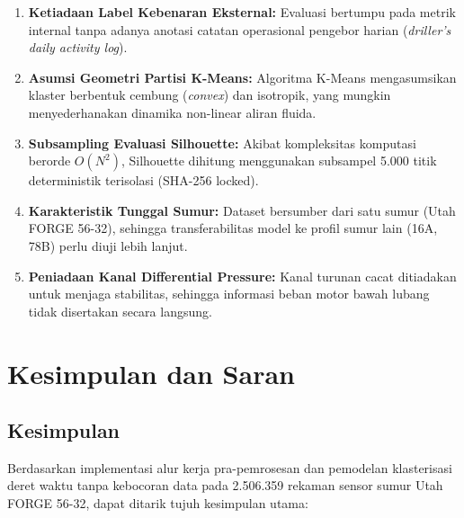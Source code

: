 \documentclass[conference]{IEEEtran}
\begin{document}
\begin{enumerate}
\item \textbf{Ketiadaan Label Kebenaran Eksternal:} Evaluasi bertumpu pada metrik internal tanpa adanya anotasi catatan operasional pengebor harian (\textit{driller's daily activity log}).
\item \textbf{Asumsi Geometri Partisi K-Means:} Algoritma K-Means mengasumsikan klaster berbentuk cembung (\textit{convex}) dan isotropik, yang mungkin menyederhanakan dinamika non-linear aliran fluida.
\item \textbf{Subsampling Evaluasi Silhouette:} Akibat kompleksitas komputasi berorde $O(N^2)$, Silhouette dihitung menggunakan subsampel 5.000 titik deterministik terisolasi (SHA-256 locked).
\item \textbf{Karakteristik Tunggal Sumur:} Dataset bersumber dari satu sumur (Utah FORGE 56-32), sehingga transferabilitas model ke profil sumur lain (16A, 78B) perlu diuji lebih lanjut.
\item \textbf{Peniadaan Kanal Differential Pressure:} Kanal turunan cacat ditiadakan untuk menjaga stabilitas, sehingga informasi beban motor bawah lubang tidak disertakan secara langsung.
\end{enumerate}

\section{Kesimpulan dan Saran}

\subsection{Kesimpulan}
Berdasarkan implementasi alur kerja pra-pemrosesan dan pemodelan klasterisasi deret waktu tanpa kebocoran data pada 2.506.359 rekaman sensor sumur Utah FORGE 56-32, dapat ditarik tujuh kesimpulan utama:
\end{document}
